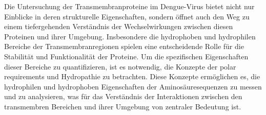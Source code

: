 \documentclass[german,version-2022-01]{uzl-thesis}
\begin{document}
Die Untersuchung der Transmembranproteine im Dengue-Virus bietet nicht nur Einblicke in deren strukturelle Eigenschaften, sondern \"offnet auch den Weg zu einem tiefergehenden Verst\"andnis der Wechselwirkungen zwischen diesen Proteinen und ihrer Umgebung. Insbesondere die hydrophoben und hydrophilen Bereiche der Transmembranregionen spielen eine entscheidende Rolle f\"ur die Stabilit\"at und Funktionalit\"at der Proteine. Um die spezifischen Eigenschaften dieser Bereiche zu quantifizieren, ist es notwendig, die Konzepte der polar requirements und Hydropathie zu betrachten. Diese Konzepte erm\"oglichen es, die hydrophilen und hydrophoben Eigenschaften der Aminos\"auresequenzen zu messen und zu analysieren, was f\"ur das Verst\"andnis der Interaktionen zwischen den transmembren Bereichen und ihrer Umgebung von zentraler Bedeutung ist.
\end{document}
